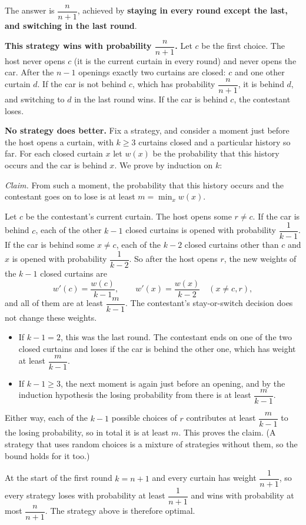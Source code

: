 The answer is $\boxed{\dfrac{n}{n+1}}$, achieved by \textbf{staying in every round except the last, and switching in the last round}.

\textbf{This strategy wins with probability $\dfrac{n}{n+1}$.} Let $c$ be the first choice. The host never opens $c$ (it is the current curtain in every round) and never opens the car. After the $n-1$ openings exactly two curtains are closed: $c$ and one other curtain $d$. If the car is not behind $c$, which has probability $\dfrac{n}{n+1}$, it is behind $d$, and switching to $d$ in the last round wins. If the car is behind $c$, the contestant loses.

\textbf{No strategy does better.} Fix a strategy, and consider a moment just before the host opens a curtain, with $k\ge3$ curtains closed and a particular history so far. For each closed curtain $x$ let $w(x)$ be the probability that this history occurs and the car is behind $x$. We prove by induction on $k$:

\emph{Claim.} From such a moment, the probability that this history occurs and the contestant goes on to lose is at least $m=\min_x w(x)$.

Let $c$ be the contestant's current curtain. The host opens some $r\ne c$. If the car is behind $c$, each of the other $k-1$ closed curtains is opened with probability $\dfrac{1}{k-1}$. If the car is behind some $x\ne c$, each of the $k-2$ closed curtains other than $c$ and $x$ is opened with probability $\dfrac{1}{k-2}$. So after the host opens $r$, the new weights of the $k-1$ closed curtains are
\[
w'(c)=\dfrac{w(c)}{k-1},\qquad w'(x)=\dfrac{w(x)}{k-2}\quad(x\ne c,r),
\]
and all of them are at least $\dfrac{m}{k-1}$. The contestant's stay-or-switch decision does not change these weights.
\begin{itemize}
\item If $k-1=2$, this was the last round. The contestant ends on one of the two closed curtains and loses if the car is behind the other one, which has weight at least $\dfrac{m}{k-1}$.
\item If $k-1\ge3$, the next moment is again just before an opening, and by the induction hypothesis the losing probability from there is at least $\dfrac{m}{k-1}$.
\end{itemize}
Either way, each of the $k-1$ possible choices of $r$ contributes at least $\dfrac{m}{k-1}$ to the losing probability, so in total it is at least $m$. This proves the claim. (A strategy that uses random choices is a mixture of strategies without them, so the bound holds for it too.)

At the start of the first round $k=n+1$ and every curtain has weight $\dfrac{1}{n+1}$, so every strategy loses with probability at least $\dfrac{1}{n+1}$ and wins with probability at most $\dfrac{n}{n+1}$. The strategy above is therefore optimal.
